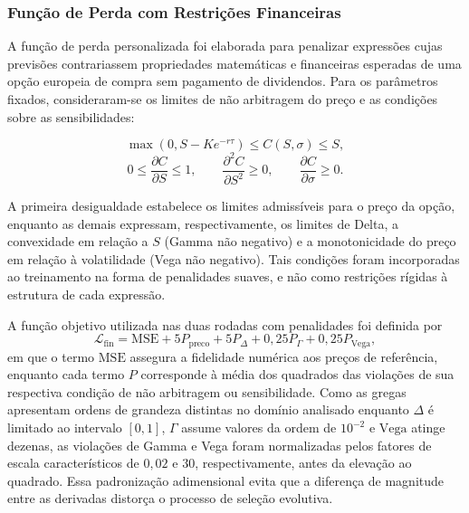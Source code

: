 \subsubsection{Função de Perda com Restrições Financeiras}
A função de perda personalizada foi elaborada para penalizar expressões cujas previsões contrariassem propriedades matemáticas e financeiras esperadas de uma opção europeia de compra sem pagamento de dividendos. Para os parâmetros fixados, consideraram-se os limites de não arbitragem do preço e as condições sobre as sensibilidades:

\begin{equation}
    \max\left(0,S-Ke^{-r\tau}\right)\leq C(S,\sigma)\leq S,
\end{equation}
\begin{equation}
    0\leq\frac{\partial C}{\partial S}\leq1,\qquad
    \frac{\partial^2 C}{\partial S^2}\geq0,\qquad
    \frac{\partial C}{\partial\sigma}\geq0.
\end{equation}

A primeira desigualdade estabelece os limites admissíveis para o preço da opção, enquanto as demais expressam, respectivamente, os limites de Delta, a convexidade em relação a $S$ (Gamma não negativo) e a monotonicidade do preço em relação à volatilidade (Vega não negativo). Tais condições foram incorporadas ao treinamento na forma de penalidades suaves, e não como restrições rígidas à estrutura de cada expressão.

A função objetivo utilizada nas duas rodadas com penalidades foi definida por
\begin{equation}
    \mathcal{L}_{\mathrm{fin}}=
    \mathrm{MSE}
    +5P_{\mathrm{preco}}
    +5P_{\Delta}
    +0{,}25P_{\Gamma}
    +0{,}25P_{\mathrm{Vega}},
\end{equation}
em que o termo $\mathrm{MSE}$ assegura a fidelidade numérica aos preços de referência, enquanto cada termo $P$ corresponde à média dos quadrados das violações de sua respectiva condição de não arbitragem ou sensibilidade. Como as gregas apresentam ordens de grandeza distintas no domínio analisado enquanto $\Delta$ é limitado ao intervalo $[0,1]$, $\Gamma$ assume valores da ordem de $10^{-2}$ e $\mathrm{Vega}$ atinge dezenas, as violações de Gamma e Vega foram normalizadas pelos fatores de escala característicos de $0{,}02$ e $30$, respectivamente, antes da elevação ao quadrado. Essa padronização adimensional evita que a diferença de magnitude entre as derivadas distorça o processo de seleção evolutiva. 

